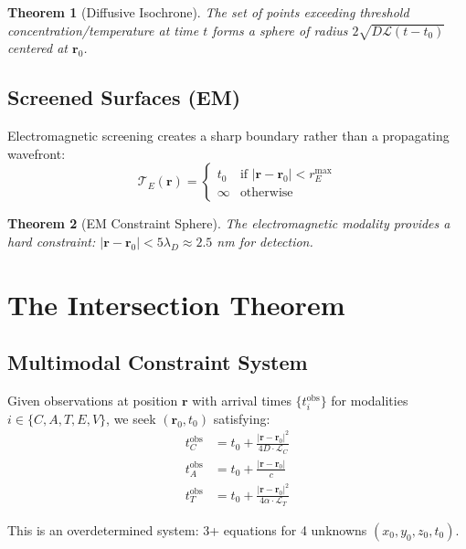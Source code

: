 \documentclass[11pt,a4paper]{article}
\newtheorem{theorem}{Theorem}[section]
\theoremstyle{remark}
\newcommand{\rxnpos}{\mathbf{r}_0}
\newcommand{\rxntime}{t_0}
\newcommand{\obspos}{\mathbf{r}}
\begin{document}
\begin{theorem}[Diffusive Isochrone]
\label{thm:diffusive_iso}
The set of points exceeding threshold concentration/temperature at time $t$ forms a sphere of radius $2\sqrt{D\mathcal{L}(t-\rxntime)}$ centered at $\rxnpos$.
\end{theorem}

\subsection{Screened Surfaces (EM)}

Electromagnetic screening creates a sharp boundary rather than a propagating wavefront:
\begin{equation}
    \mathcal{T}_E(\obspos) = \begin{cases}
        \rxntime & \text{if } |\obspos - \rxnpos| < r_E^{\max} \\
        \infty & \text{otherwise}
    \end{cases}
\end{equation}

\begin{theorem}[EM Constraint Sphere]
\label{thm:em_sphere}
The electromagnetic modality provides a hard constraint: $|\obspos - \rxnpos| < 5\lambda_D \approx 2.5$ nm for detection.
\end{theorem}

\section{The Intersection Theorem}
\label{sec:intersection}

\subsection{Multimodal Constraint System}

Given observations at position $\obspos$ with arrival times $\{t_i^{\text{obs}}\}$ for modalities $i \in \{C, A, T, E, V\}$, we seek $(\rxnpos, \rxntime)$ satisfying:
\begin{align}
    t_C^{\text{obs}} &= \rxntime + \frac{|\obspos - \rxnpos|^2}{4D \cdot \mathcal{L}_C} \\
    t_A^{\text{obs}} &= \rxntime + \frac{|\obspos - \rxnpos|}{c} \\
    t_T^{\text{obs}} &= \rxntime + \frac{|\obspos - \rxnpos|^2}{4\alpha \cdot \mathcal{L}_T}
\end{align}

This is an overdetermined system: 3+ equations for 4 unknowns $(x_0, y_0, z_0, \rxntime)$.
\end{document}
